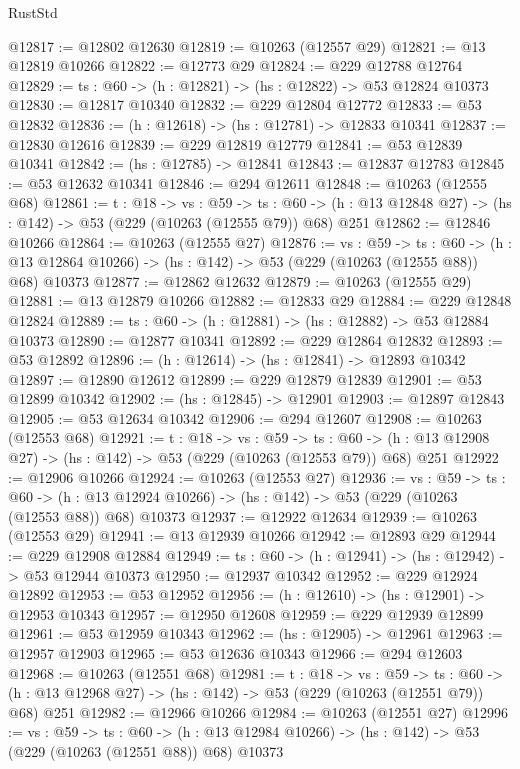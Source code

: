 \begin{lexlean}{RustStd}
\begin{coremodule}
@12817 := @12802 @12630
@12819 := @10263 (@12557 @29)
@12821 := @13 @12819 @10266
@12822 := @12773 @29
@12824 := @229 @12788 @12764
@12829 := {ts : @60} -> (h : @12821) -> (hs : @12822) -> @53 @12824 @10373
@12830 := @12817 @10340
@12832 := @229 @12804 @12772
@12833 := @53 @12832
@12836 := (h : @12618) -> (hs : @12781) -> @12833 @10341
@12837 := @12830 @12616
@12839 := @229 @12819 @12779
@12841 := @53 @12839 @10341
@12842 := (hs : @12785) -> @12841
@12843 := @12837 @12783
@12845 := @53 @12632 @10341
@12846 := @294 @12611
@12848 := @10263 (@12555 @68)
@12861 := {t : @18} ->
  {vs : @59} ->
  {ts : @60} -> (h : @13 @12848 @27) -> (hs : @142) -> @53 (@229 (@10263 (@12555 @79)) @68) @251
@12862 := @12846 @10266
@12864 := @10263 (@12555 @27)
@12876 := {vs : @59} ->
  {ts : @60} ->
  (h : @13 @12864 @10266) -> (hs : @142) -> @53 (@229 (@10263 (@12555 @88)) @68) @10373
@12877 := @12862 @12632
@12879 := @10263 (@12555 @29)
@12881 := @13 @12879 @10266
@12882 := @12833 @29
@12884 := @229 @12848 @12824
@12889 := {ts : @60} -> (h : @12881) -> (hs : @12882) -> @53 @12884 @10373
@12890 := @12877 @10341
@12892 := @229 @12864 @12832
@12893 := @53 @12892
@12896 := (h : @12614) -> (hs : @12841) -> @12893 @10342
@12897 := @12890 @12612
@12899 := @229 @12879 @12839
@12901 := @53 @12899 @10342
@12902 := (hs : @12845) -> @12901
@12903 := @12897 @12843
@12905 := @53 @12634 @10342
@12906 := @294 @12607
@12908 := @10263 (@12553 @68)
@12921 := {t : @18} ->
  {vs : @59} ->
  {ts : @60} -> (h : @13 @12908 @27) -> (hs : @142) -> @53 (@229 (@10263 (@12553 @79)) @68) @251
@12922 := @12906 @10266
@12924 := @10263 (@12553 @27)
@12936 := {vs : @59} ->
  {ts : @60} ->
  (h : @13 @12924 @10266) -> (hs : @142) -> @53 (@229 (@10263 (@12553 @88)) @68) @10373
@12937 := @12922 @12634
@12939 := @10263 (@12553 @29)
@12941 := @13 @12939 @10266
@12942 := @12893 @29
@12944 := @229 @12908 @12884
@12949 := {ts : @60} -> (h : @12941) -> (hs : @12942) -> @53 @12944 @10373
@12950 := @12937 @10342
@12952 := @229 @12924 @12892
@12953 := @53 @12952
@12956 := (h : @12610) -> (hs : @12901) -> @12953 @10343
@12957 := @12950 @12608
@12959 := @229 @12939 @12899
@12961 := @53 @12959 @10343
@12962 := (hs : @12905) -> @12961
@12963 := @12957 @12903
@12965 := @53 @12636 @10343
@12966 := @294 @12603
@12968 := @10263 (@12551 @68)
@12981 := {t : @18} ->
  {vs : @59} ->
  {ts : @60} -> (h : @13 @12968 @27) -> (hs : @142) -> @53 (@229 (@10263 (@12551 @79)) @68) @251
@12982 := @12966 @10266
@12984 := @10263 (@12551 @27)
@12996 := {vs : @59} ->
  {ts : @60} ->
  (h : @13 @12984 @10266) -> (hs : @142) -> @53 (@229 (@10263 (@12551 @88)) @68) @10373

\end{coremodule}
\end{lexlean}
